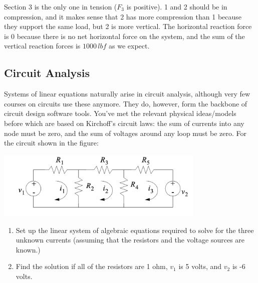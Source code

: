 \begin{sol}
\begin{enumerate}
 Section 3 is the only one in tension ($F_3$ is positive). 1 and 2 should be in compression, and it makes sense that 2 has more compression than 1 because they support the same load, but 2 is more vertical. The horizontal reaction force is $0$ because there is no net horizontal force on the system, and the sum of the vertical reaction forces is $1000\, lbf$ as we expect.
\end{enumerate}
\end{sol}


\subsection{Circuit Analysis}

\begin{prob}
Systems of linear equations naturally arise in circuit analysis, although very few courses on circuits use these anymore. They do, however, form the backbone of circuit design software tools. You've met the relevant physical ideas/models before which are based on Kirchoff's circuit laws: the sum of currents into any node must be zero, and the sum of voltages around any loop must be zero. For the circuit shown in the figure:
\begin{center} 
\includegraphics[width=0.75\textwidth]{FacesNight4/figs/simple_circuit.png}
\end{center}

\begin{enumerate}
\item Set up the linear system of algebraic equations required to solve for the three unknown currents (assuming that the resistors and the voltage sources are known.)
\item Find the solution if all of the resistors are 1 ohm, $v_1$ is 5 volts, and $v_2$ is -6 volts.
\end{enumerate}
\end{prob}
